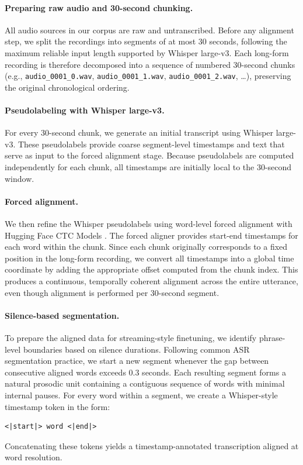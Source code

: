 \documentclass{article}
\begin{document}
\paragraph{Preparing raw audio and 30-second chunking.}
All audio sources in our corpus are raw and untranscribed. Before any alignment step, we split the recordings into segments of at most 30 seconds, following the maximum reliable input length supported by Whisper large-v3. Each long-form recording is therefore decomposed into a sequence of numbered 30-second chunks (e.g., \texttt{audio\_0001\_0.wav}, \texttt{audio\_0001\_1.wav}, \texttt{audio\_0001\_2.wav}, \ldots), preserving the original chronological ordering.

\paragraph{Pseudolabeling with Whisper large-v3.}
For every 30-second chunk, we generate an initial transcript using Whisper large-v3. These pseudolabels provide coarse segment-level timestamps and text that serve as input to the forced alignment stage. Because pseudolabels are computed independently for each chunk, all timestamps are initially local to the 30-second window.

\paragraph{Forced alignment.}
We then refine the Whisper pseudolabels using word-level forced alignment with Hugging Face CTC Models \citep{ashraf2024ctcforcedaligner}. The forced aligner provides start-end timestamps for each word within the chunk. Since each chunk originally corresponds to a fixed position in the long-form recording, we convert all timestamps into a global time coordinate by adding the appropriate offset computed from the chunk index. This produces a continuous, temporally coherent alignment across the entire utterance, even though alignment is performed per 30-second segment.

\paragraph{Silence-based segmentation.}
To prepare the aligned data for streaming-style finetuning, we identify phrase-level boundaries based on silence durations. Following common ASR segmentation practice, we start a new segment whenever the gap between consecutive aligned words exceeds 0.3 seconds. Each resulting segment forms a natural prosodic unit containing a contiguous sequence of words with minimal internal pauses. For every word within a segment, we create a Whisper-style timestamp token in the form:
\begin{verbatim}
<|start|> word <|end|>
\end{verbatim}
Concatenating these tokens yields a timestamp-annotated transcription aligned at word resolution.
\end{document}
